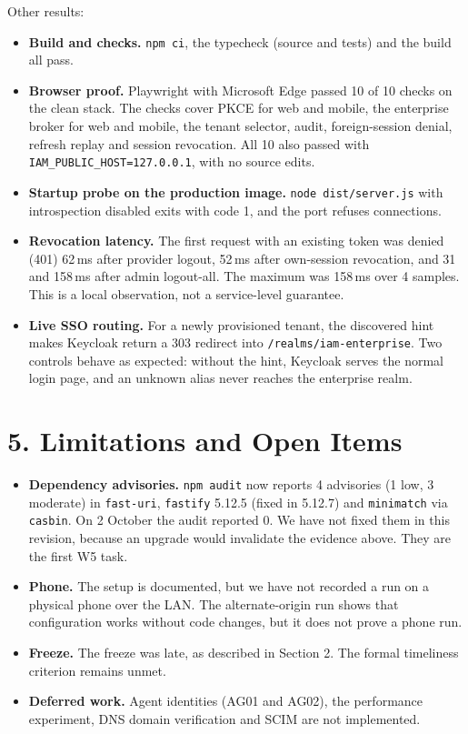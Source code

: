 \documentclass{article}
\begin{document}
Other results:
\begin{itemize}
    \item \textbf{Build and checks.} \texttt{npm ci}, the typecheck (source and tests) and the build all pass.
    \item \textbf{Browser proof.} Playwright with Microsoft Edge passed 10 of 10 checks on the clean stack. The checks cover PKCE for web and mobile, the enterprise broker for web and mobile, the tenant selector, audit, foreign-session denial, refresh replay and session revocation. All 10 also passed with \texttt{IAM\_PUBLIC\_HOST=127.0.0.1}, with no source edits.
    \item \textbf{Startup probe on the production image.} \texttt{node dist/server.js} with introspection disabled exits with code 1, and the port refuses connections.
    \item \textbf{Revocation latency.} The first request with an existing token was denied (401) 62\,ms after provider logout, 52\,ms after own-session revocation, and 31 and 158\,ms after admin logout-all. The maximum was 158\,ms over 4 samples. This is a local observation, not a service-level guarantee.
    \item \textbf{Live SSO routing.} For a newly provisioned tenant, the discovered hint makes Keycloak return a 303 redirect into \texttt{/realms/iam-enterprise}. Two controls behave as expected: without the hint, Keycloak serves the normal login page, and an unknown alias never reaches the enterprise realm.
\end{itemize}

\section*{5. Limitations and Open Items}
\begin{itemize}
    \item \textbf{Dependency advisories.} \texttt{npm audit} now reports 4 advisories (1 low, 3 moderate) in \texttt{fast-uri}, \texttt{fastify} 5.12.5 (fixed in 5.12.7) and \texttt{minimatch} via \texttt{casbin}. On 2 October the audit reported 0. We have not fixed them in this revision, because an upgrade would invalidate the evidence above. They are the first W5 task.
    \item \textbf{Phone.} The setup is documented, but we have not recorded a run on a physical phone over the LAN. The alternate-origin run shows that configuration works without code changes, but it does not prove a phone run.
    \item \textbf{Freeze.} The freeze was late, as described in Section 2. The formal timeliness criterion remains unmet.
    \item \textbf{Deferred work.} Agent identities (AG01 and AG02), the performance experiment, DNS domain verification and SCIM are not implemented.
\end{itemize}
\end{document}
